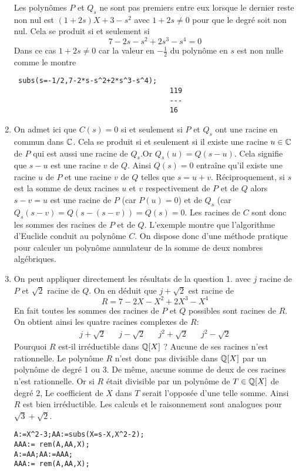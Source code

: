 \begin{enumerate}
\begin{verbatim}
\end{verbatim}
Les polynômes $P$ et $Q_s$ ne sont pas premiers entre eux lorsque le dernier reste non nul est $(1+2s)X+3-s^2$ avec $1+2s\neq0$ pour que le degré soit non nul. Cela se produit si et seulement si
\begin{displaymath}
 7-2s-s^2+2s^3-s^4=0
\end{displaymath}
Dans ce cas $1+2s\neq0$ car la valeur en $-\frac{1}{2}$ du polynôme en $s$ est non nulle comme le montre
\begin{verbatim}
 subs(s=-1/2,7-2*s-s^2+2*s^3-s^4);
                                     119
                                     ---
                                     16 
\end{verbatim}
\item On admet ici que $C(s)=0$ si et seulement si $P$ et $Q_s$ ont une racine en commun dans $\mathbb{C}$. Cela se produit si et seulement si il existe une racine $u\in\mathbb{C}$ de $P$ qui est aussi une racine de $Q_s$.Or $Q_s(u)=Q(s-u)$. Cela signifie que $s-u$ est une racine $v$ de $Q$.\newline
Ainsi $Q(s)=0$ entraîne qu'il existe une racine $u$ de $P$ et une racine $v$ de $Q$ telles que $s=u+v$. Réciproquement, si $s$ est la somme de deux racines $u$ et $v$ respectivement de $P$ et de $Q$ alors $s-v=u$ est une racine de $P$ (car $P(u)=0$) et de $Q_s$ (car $Q_s(s-v)=Q(s-(s-v))=Q(s)=0$.\newline
Les racines de $C$ sont donc les sommes des racines de $P$ et de $Q$. \newline
L'exemple montre que l'algorithme d'Euclide conduit au polynôme $C$. On dispose donc d'une méthode pratique pour calculer un polynôme annulateur de la somme de deux nombres algébriques.

\item On peut appliquer directement les résultats de la question 1. avec $j$ racine de $P$ et $\sqrt{2}$ racine de $Q$. On en déduit que $j+\sqrt{2}$ est racine de
\begin{displaymath}
 R=7-2X-X^2+2X^3-X^4
\end{displaymath}
En fait toutes les sommes des racines de $P$ et $Q$ possibles sont racines de $R$. On obtient ainsi les quatre racines complexes de $R$:
\begin{align*}
 j+\sqrt{2} & & j-\sqrt{2} & & j^2+\sqrt{2} & & j^2-\sqrt{2} 
\end{align*}
Pourquoi $R$ est-il irréductible dans $\mathbb{Q}[X]$ ?\newline
Aucune de ses racines n'est rationnelle. Le polynôme $R$ n'est donc pas divisible dans $\mathbb{Q}[X]$ par un polynôme de degré 1 ou 3. De même, aucune somme de deux de ces racines n'est rationnelle. Or si $R$ était divisible par un polynôme de $T\in\mathbb{Q}[X]$ de degré $2$, Le coefficient de $X$ dans $T$ serait l'opposée d'une telle somme. Ainsi $R$ est bien irréductible.\newline
Les calculs et le raisonnement sont analogues pour $\sqrt{3}+\sqrt{2}$.
\begin{verbatim}
A:=X^2-3;AA:=subs(X=s-X,X^2-2);
AAA:= rem(A,AA,X);
A:=AA;AA:=AAA;
AAA:= rem(A,AA,X);


\end{verbatim}
\end{enumerate}
